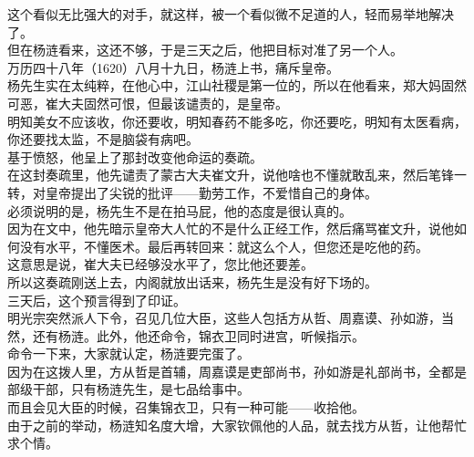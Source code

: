 \begin{multicols}{\theparacolNo}
这个看似无比强大的对手，就这样，被一个看似微不足道的人，轻而易举地解决了。\\

但在杨涟看来，这还不够，于是三天之后，他把目标对准了另一个人。\\

万历四十八年（1620）八月十九日，杨涟上书，痛斥皇帝。\\

杨先生实在太纯粹，在他心中，江山社稷是第一位的，所以在他看来，郑大妈固然可恶，崔大夫固然可恨，但最该谴责的，是皇帝。\\

明知美女不应该收，你还要收，明知春药不能多吃，你还要吃，明知有太医看病，你还要找太监，不是脑袋有病吧。\\

基于愤怒，他呈上了那封改变他命运的奏疏。\\

在这封奏疏里，他先谴责了蒙古大夫崔文升，说他啥也不懂就敢乱来，然后笔锋一转，对皇帝提出了尖锐的批评——勤劳工作，不爱惜自己的身体。\\

必须说明的是，杨先生不是在拍马屁，他的态度是很认真的。\\

因为在文中，他先暗示皇帝大人忙的不是什么正经工作，然后痛骂崔文升，说他如何没有水平，不懂医术。最后再转回来：就这么个人，但您还是吃他的药。\\

这意思是说，崔大夫已经够没水平了，您比他还要差。\\

所以这奏疏刚送上去，内阁就放出话来，杨先生是没有好下场的。\\

三天后，这个预言得到了印证。\\

明光宗突然派人下令，召见几位大臣，这些人包括方从哲、周嘉谟、孙如游，当然，还有杨涟。此外，他还命令，锦衣卫同时进宫，听候指示。\\

命令一下来，大家就认定，杨涟要完蛋了。\\

因为在这拨人里，方从哲是首辅，周嘉谟是吏部尚书，孙如游是礼部尚书，全都是部级干部，只有杨涟先生，是七品给事中。\\

而且会见大臣的时候，召集锦衣卫，只有一种可能——收拾他。\\

由于之前的举动，杨涟知名度大增，大家钦佩他的人品，就去找方从哲，让他帮忙求个情。\\


\end{multicols}
